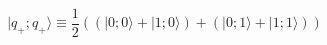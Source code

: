 \begin{equation}
\label{2pp}
|q_+;q_+ \rangle \equiv \frac{1}{2}\left(  
(|0;0 \rangle+|1;0 \rangle)+(|0;1 \rangle+|1;1 \rangle)\right)
\end{equation}

